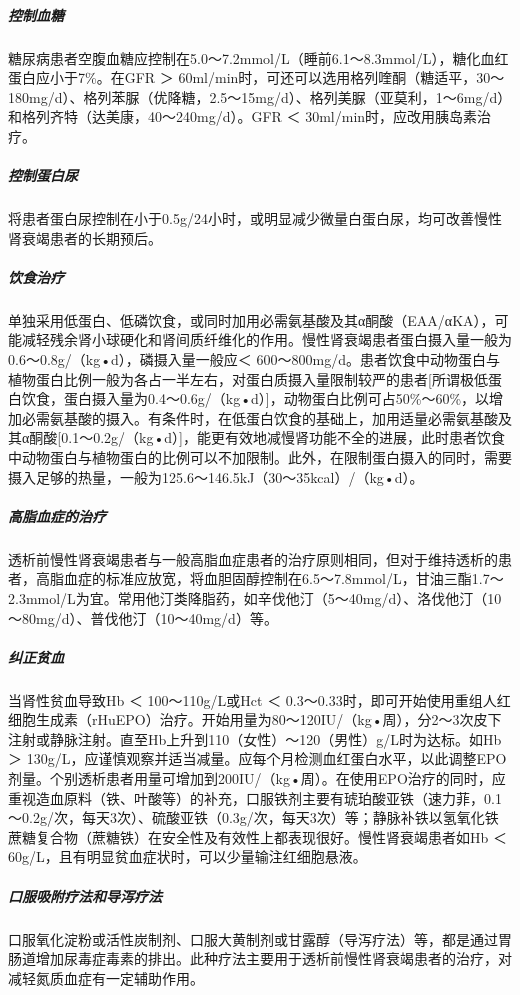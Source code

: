 \subparagraph{控制血糖}

糖尿病患者空腹血糖应控制在5.0～7.2mmol/L（睡前6.1～8.3mmol/L），糖化血红蛋白应小于7\%。在GFR
＞
60ml/min时，可还可以选用格列喹酮（糖适平，30～180mg/d）、格列苯脲（优降糖，2.5～15mg/d）、格列美脲（亚莫利，1～6mg/d）和格列齐特（达美康，40～240mg/d）。GFR
＜ 30ml/min时，应改用胰岛素治疗。

\subparagraph{控制蛋白尿}

将患者蛋白尿控制在小于0.5g/24小时，或明显减少微量白蛋白尿，均可改善慢性肾衰竭患者的长期预后。

\subparagraph{饮食治疗}

单独采用低蛋白、低磷饮食，或同时加用必需氨基酸及其α酮酸（EAA/αKA），可能减轻残余肾小球硬化和肾间质纤维化的作用。慢性肾衰竭患者蛋白摄入量一般为0.6～0.8g/（kg•d），磷摄入量一般应＜
600～800mg/d。患者饮食中动物蛋白与植物蛋白比例一般为各占一半左右，对蛋白质摄入量限制较严的患者{[}所谓极低蛋白饮食，蛋白摄入量为0.4～0.6g/（kg•d）{]}，动物蛋白比例可占50\%～60\%，以增加必需氨基酸的摄入。有条件时，在低蛋白饮食的基础上，加用适量必需氨基酸及其α酮酸{[}0.1～0.2g/（kg•d）{]}，能更有效地减慢肾功能不全的进展，此时患者饮食中动物蛋白与植物蛋白的比例可以不加限制。此外，在限制蛋白摄入的同时，需要摄入足够的热量，一般为125.6～146.5kJ（30～35kcal）/（kg•d）。

\subparagraph{高脂血症的治疗}

透析前慢性肾衰竭患者与一般高脂血症患者的治疗原则相同，但对于维持透析的患者，高脂血症的标准应放宽，将血胆固醇控制在6.5～7.8mmol/L，甘油三酯1.7～2.3mmol/L为宜。常用他汀类降脂药，如辛伐他汀（5～40mg/d）、洛伐他汀（10～80mg/d）、普伐他汀（10～40mg/d）等。

\subparagraph{纠正贫血}

当肾性贫血导致Hb ＜ 100～110g/L或Hct ＜
0.3～0.33时，即可开始使用重组人红细胞生成素（rHuEPO）治疗。开始用量为80～120IU/（kg•周），分2～3次皮下注射或静脉注射。直至Hb上升到110（女性）～120（男性）g/L时为达标。如Hb
＞
130g/L，应谨慎观察并适当减量。应每个月检测血红蛋白水平，以此调整EPO剂量。个别透析患者用量可增加到200IU/（kg•周）。在使用EPO治疗的同时，应重视造血原料（铁、叶酸等）的补充，口服铁剂主要有琥珀酸亚铁（速力菲，0.1～0.2g/次，每天3次）、硫酸亚铁（0.3g/次，每天3次）等；静脉补铁以氢氧化铁蔗糖复合物（蔗糖铁）在安全性及有效性上都表现很好。慢性肾衰竭患者如Hb
＜ 60g/L，且有明显贫血症状时，可以少量输注红细胞悬液。

\subparagraph{口服吸附疗法和导泻疗法}

口服氧化淀粉或活性炭制剂、口服大黄制剂或甘露醇（导泻疗法）等，都是通过胃肠道增加尿毒症毒素的排出。此种疗法主要用于透析前慢性肾衰竭患者的治疗，对减轻氮质血症有一定辅助作用。

